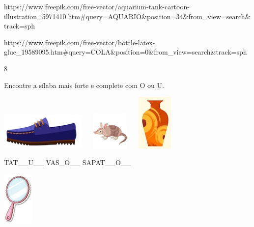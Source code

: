 {https://www.freepik.com/free-vector/aquarium-tank-cartoon-illustration\_5971410.htm\#query=AQUARIO\&position=34\&from\_view=search\&track=sph

https://www.freepik.com/free-vector/bottle-latex-glue\_19589095.htm\#query=COLA\&position=0\&from\_view=search\&track=sph

\num{8}

Encontre a sílaba mais forte e complete com O ou U.


\includegraphics[width=1.65486in,height=0.74499in]{media/image34.jpeg}
\includegraphics[width=1.09512in,height=0.74522in]{media/image35.jpeg}
\includegraphics[width=0.69978in,height=1.10152in]{media/image36.jpeg}

TAT\_\_U\_\_ VAS\_O\_\_ SAPAT\_\_O\_\_

\includegraphics[width=0.59861in,height=1.03542in]{media/image37.jpeg}

}
